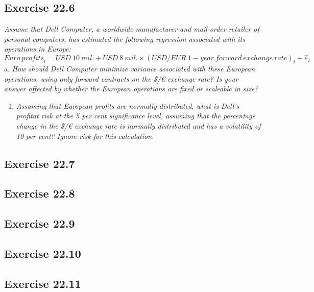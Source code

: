 \documentclass[]{book}
\newcommand{\euro}{€}
\providecommand{\tightlist}{%
  \setlength{\itemsep}{0pt}\setlength{\parskip}{0pt}}
\theoremstyle{definition}
\theoremstyle{definition}
\theoremstyle{remark}
\begin{document}
\subsection{Exercise 22.6}\label{exercise-22.6}

\emph{Assume that Dell Computer, a worldwide manufacturer and mail-order
retailer of personal computers, has estimated the following regression
associated with its operations in Europe:} \citep[p.752]{book}
\[{Euro \ profits}_t = USD \ 10 \ mil.+ USD \ 8 \ mil. \times \left(USD/EUR \ 1-year \ forward \ exchange \ rate\right)_t+\overset{\sim}{\varepsilon}_t\]
a. \emph{How should Dell Computer minimize variance associated with
these European operations, using only forward contracts on the
\$/\euro{} exchange rate? Is your answer affected by whether the
European operations are fixed or scaleable in size?} \citep[p.752]{book}

\begin{enumerate}
\def\labelenumi{\alph{enumi}.}
\setcounter{enumi}{1}
\tightlist
\item
  \emph{Assuming that European profits are normally distributed, what is
  Dell's profitat risk at the 5 per cent significance level, assuming
  that the percentage change in the \$/\euro{} exchange rate is normally
  distributed and has a volatility of 10 per cent? Ignore risk for this
  calculation.} \citep[p.753]{book}
\end{enumerate}

\subsection{Exercise 22.7}\label{exercise-22.7}

\subsection{Exercise 22.8}\label{exercise-22.8}

\subsection{Exercise 22.9}\label{exercise-22.9}

\subsection{Exercise 22.10}\label{exercise-22.10}

\subsection{Exercise 22.11}\label{exercise-22.11}
\end{document}

